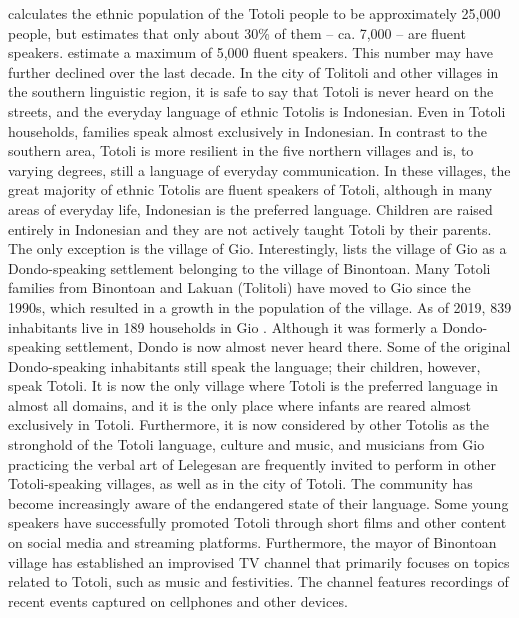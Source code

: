 \citet[18]{himmelmann_source_book} calculates the ethnic population of the Totoli people to be approximately 25,000 people, but estimates that only about 30\% of them – ca. 7,000 – are fluent speakers. \citet{Totoli_Dobes} estimate a maximum of 5,000 fluent speakers. This number may have further declined over the last decade. In the city of Tolitoli and other villages in the southern linguistic region, it is safe to say that Totoli is never heard on the streets, and the everyday language of ethnic Totolis is Indonesian. Even in Totoli households, families speak almost exclusively in Indonesian. In contrast to the southern area, Totoli is more resilient in the five northern villages  and is, to varying degrees, still a language of everyday communication. In these villages, the great majority of ethnic Totolis are fluent speakers of Totoli, although in many areas of everyday life, Indonesian is the preferred language. Children are raised entirely in Indonesian and they are not actively taught Totoli by their parents. The only exception is the village of Gio.
Interestingly, \citet[28]{himmelmann_source_book} lists the village of Gio as a Dondo-speaking  settlement belonging to the village of Binontoan. Many Totoli families from Binontoan and Lakuan (Tolitoli) have moved to Gio since the 1990s, which resulted in a growth in the population of the village. As of 2019, 839 inhabitants live in 189 households in Gio \citep[7]{Statistics_TolUt_2019}. Although it was formerly a Dondo-speaking  settlement, Dondo  is now almost never heard there. Some of the original Dondo-speaking  inhabitants still speak the language; their children, however, speak Totoli. It is now the only village where Totoli is the preferred language in almost all domains, and it is the only place where infants are reared almost exclusively in Totoli. Furthermore, it is now considered by other Totolis as the stronghold of the Totoli language, culture and music, and musicians from Gio practicing the verbal art of Lelegesan \citep{riesberg2019fern, bracks2022totoli} are frequently invited to perform in other Totoli-speaking villages, as well as in the city of Totoli.
The community has become increasingly aware of the endangered state of their language. Some young speakers have successfully promoted Totoli through short films and other content on social media and streaming platforms. Furthermore, the mayor of Binontoan village has established an improvised TV channel that primarily focuses on topics related to Totoli, such as music and festivities. The channel  features recordings of recent events captured on cellphones and other devices.


